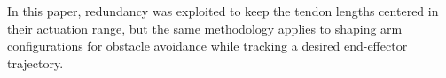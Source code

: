 In this paper, redundancy was exploited to keep the tendon lengths centered in their actuation range, but the same methodology applies to shaping arm configurations for obstacle avoidance while tracking a desired end-effector trajectory.
